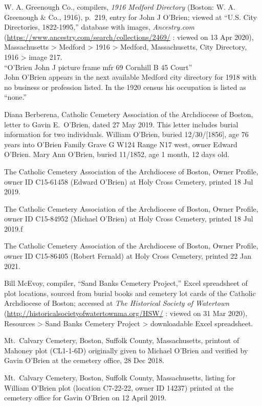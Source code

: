 
\begin{thebibliography}{999}
	\raggedright
	\small



W. A. Greenough Co., compilers, \textit{1916 Medford Directory} (Boston: W. A. Greenough \& Co., 1916), p.\ 219, entry for John J O'Brien; viewed at ``U.S. City Directories, 1822-1995,'' database with images, \textit{Ancestry.com} (\url{https://www.ancestry.com/search/collections/2469/} : viewed on 13 Apr 2020), Massachusetts > Medford > 1916 > Medford, Massachusetts, City Directory, 1916 > image 217.\\
``O'Brien John J picture frame mfr 69 Cornhill B 45 Court''\\
John O'Brien appears in the next available Medford city directory for 1918 with no business or profession listed. In the 1920 census his occupation is listed as ``none.''


Diana Berberena, Catholic Cemetery Association of the Archdiocese of Boston, letter to Gavin E.\ O'Brien, dated 27 May 2019. This letter includes burial information for two individuals. William O'Brien, buried 12/30/[1856], age 76 years into O'Brien Family Grave G W124 Range N17 west, owner Edward O'Brien. Mary Ann O'Brien, buried 11/1852, age 1 month, 12 days old.

The Catholic Cemetery Association of the Archdiocese of Boston, Owner Profile, owner ID C15-61458 (Edward O'Brien) at Holy Cross Cemetery, printed 18 Jul 2019.

The Catholic Cemetery Association of the Archdiocese of Boston, Owner Profile, owner ID C15-84952 (Michael O'Brien) at Holy Cross Cemetery, printed 18 Jul 2019.ƒ

The Catholic Cemetery Association of the Archdiocese of Boston, Owner Profile, owner ID C15-86405 (Robert Fernald) at Holy Cross Cemetery, printed 22 Jan 2021.

Bill McEvoy, compiler, ``Sand Banks Cemetery Project,'' Excel spreadsheet of plot locations, sourced from burial books and cemetery lot cards of the Catholic Archdiocese of Boston; accessed at \textit{The Historical Society of Watertown} (\url{http://historicalsocietyofwatertownma.org/HSW/} : viewed on 31 Mar 2020), Resources > Sand Banks Cemetery Project > downloadable Excel spreadsheet.

Mt.\ Calvary Cemetery, Boston, Suffolk County, Massachusetts, printout of Mahoney plot (CL1-1-6D) originally given to Michael O'Brien and verified by Gavin O'Brien at the cemetery office, 28 Dec 2018.

Mt.\ Calvary Cemetery, Boston, Suffolk County, Massachusetts, listing for William O'Brien plot (location C7-22-22, owner ID 14237) printed at the cemetery office for Gavin O'Brien on 12 April 2019.

\end{thebibliography}